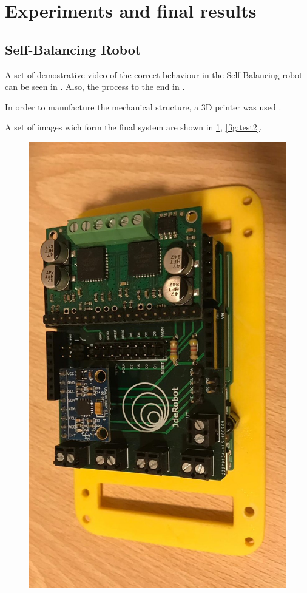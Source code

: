 \section{Experiments and final results}
\subsection{Self-Balancing Robot}
\newline 
A set of demostrative video of the correct behaviour in the Self-Balancing robot can be seen in \cite{self2}. Also, the process to the end in \cite{self1} \cite{self3}.\newline

In order to manufacture the mechanical structure, a 3D printer was used \cite{print1}.

A set of images wich form the final system are shown in \ref{fig:test1}, \ref{fig:test2}.

\begin{center}
\begin{figure}[H]
	\center
	\includegraphics[scale=0.3, angle=270]{imagenes/Balancing_Robot/test1}
	\caption{}
	\label{fig:test1}
\end{figure}
\end{center}


